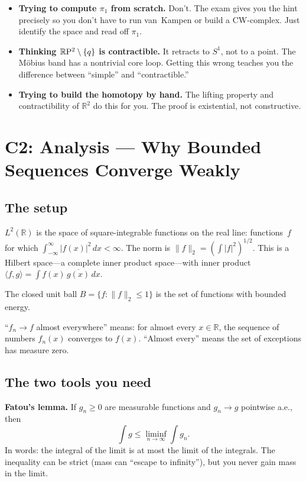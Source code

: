 \begin{itemize}
\item \textbf{Trying to compute $\pi_1$ from scratch.} Don't. The exam
  gives you the hint precisely so you don't have to run van~Kampen or
  build a CW-complex. Just identify the space and read off $\pi_1$.
\item \textbf{Thinking $\mathbb{R}\mathrm{P}^2 \setminus \{q\}$ is contractible.} It
  retracts to $S^1$, not to a point. The M\"obius band has a
  nontrivial core loop. Getting this wrong teaches you the difference
  between ``simple'' and ``contractible.''
\item \textbf{Trying to build the homotopy by hand.} The lifting
  property and contractibility of $\mathbb{R}^2$ do this for you. The
  proof is existential, not constructive.
\end{itemize}

\chapter{C2: Analysis --- Why Bounded Sequences Converge Weakly}\label{ch:lesson-c2}

\section{The setup}

$L^2(\mathbb{R})$ is the space of square-integrable functions on the real
line: functions~$f$ for which $\int_{-\infty}^{\infty} |f(x)|^2\,dx <
\infty$. The norm is $\|f\|_2 = (\int |f|^2)^{1/2}$. This is a Hilbert
space---a complete inner product space---with inner product $\langle f, g
\rangle = \int f(x)\,\overline{g(x)}\,dx$.

The closed unit ball $B = \{f : \|f\|_2 \le 1\}$ is the set of functions
with bounded energy.

``$f_n \to f$ almost everywhere'' means: for almost every $x \in
\mathbb{R}$, the sequence of numbers $f_n(x)$ converges to $f(x)$.
``Almost every'' means the set of exceptions has measure zero.

\section{The two tools you need}

\textbf{Fatou's lemma.} If $g_n \ge 0$ are measurable functions and
$g_n \to g$ pointwise a.e., then
\[
  \int g \le \liminf_{n \to \infty} \int g_n.
\]
In words: the integral of the limit is at most the limit of the
integrals. The inequality can be strict (mass can ``escape to infinity''),
but you never gain mass in the limit.

